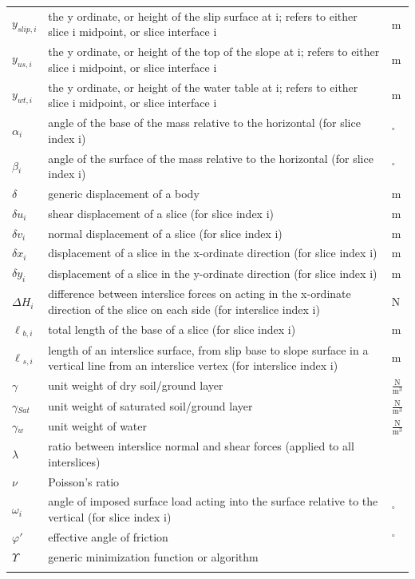 \documentclass[12pt]{article}
\begin{document}
\begin{longtable*}{l l l}
\\
$y_{slip,i}$ & the y ordinate, or height of the slip surface at i; refers to either slice i midpoint, or slice interface i & m
\\
$y_{us,i}$ & the y ordinate, or height of the top of the slope at i; refers to either slice i midpoint, or slice interface i & m
\\
$y_{wt,i}$ & the y ordinate, or height of the water table at i; refers to either slice i midpoint, or slice interface i & m
\\
$\alpha{}_{i}$ & angle of the base of the mass relative to the horizontal (for slice index i) & ${}^{\circ}$
\\
$\beta{}_{i}$ & angle of the surface of the mass relative to the horizontal (for slice index i) & ${}^{\circ}$
\\
$\delta{}$ & generic displacement of a body & m
\\
$\delta{}u_{i}$ & shear displacement of a slice (for slice index i) & m
\\
$\delta{}v_{i}$ & normal displacement of a slice (for slice index i) & m
\\
$\delta{}x_{i}$ & displacement of a slice in the x-ordinate direction (for slice index i) & m
\\
$\delta{}y_{i}$ & displacement of a slice in the y-ordinate direction (for slice index i) & m
\\
$\Delta{}H_{i}$ & difference between interslice forces on acting in the x-ordinate direction of the slice on each side (for interslice index i) & N
\\
$\ell{}_{b,i}$ & total length of the base of a slice (for slice index i) & m
\\
$\ell{}_{s,i}$ & length of an interslice surface, from slip base to slope surface in a vertical line from an interslice vertex (for interslice index i) & m
\\
$\gamma{}$ & unit weight of dry soil/ground layer & $\frac{\text{N}}{\text{m}^{3}}$
\\
$\gamma{}_{Sat}$ & unit weight of saturated soil/ground layer & $\frac{\text{N}}{\text{m}^{3}}$
\\
$\gamma{}_{w}$ & unit weight of water & $\frac{\text{N}}{\text{m}^{3}}$
\\
$\lambda{}$ & ratio between interslice normal and shear forces (applied to all interslices) & 
\\
$\nu{}$ & Poisson's ratio & 
\\
$\omega{}_{i}$ & angle of imposed surface load acting into the surface relative to the vertical (for slice index i) & ${}^{\circ}$
\\
$\varphi{}'$ & effective angle of friction & ${}^{\circ}$
\\
$\Upsilon{}$ & generic minimization function or algorithm & 
\\
\bottomrule
\label{Table:ToS}
\end{longtable*}
\end{document}
